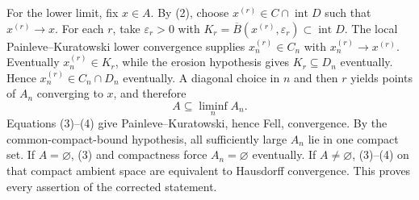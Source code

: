 For the lower limit, fix \(x\in A\).  By (2), choose \(x^{(r)}\in C\cap\operatorname{int}D\) such that \(x^{(r)}\to x\).  For each \(r\), take \(\varepsilon_r>0\) with
\(K_r=\overline{B}(x^{(r)},\varepsilon_r)\subset\operatorname{int}D\).  The local Painleve--Kuratowski lower convergence supplies \(x_n^{(r)}\in C_n\) with \(x_n^{(r)}\to x^{(r)}\).  Eventually \(x_n^{(r)}\in K_r\), while the erosion hypothesis gives \(K_r\subseteq D_n\) eventually.  Hence \(x_n^{(r)}\in C_n\cap D_n\) eventually.  A diagonal choice in \(n\) and then \(r\) yields points of \(A_n\) converging to \(x\), and therefore
\[
 A\subseteq\liminf_n A_n. \tag{4}
\]
Equations (3)--(4) give Painleve--Kuratowski, hence Fell, convergence.  By the common-compact-bound hypothesis, all sufficiently large \(A_n\) lie in one compact set.  If \(A=\varnothing\), (3) and compactness force \(A_n=\varnothing\) eventually.  If \(A\ne\varnothing\), (3)--(4) on that compact ambient space are equivalent to Hausdorff convergence.  This proves every assertion of the corrected statement.